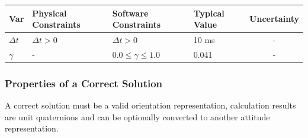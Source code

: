 \documentclass[12pt]{article}
\begin{document}

\begin{table}[!h]
  \caption{Input Variables} \label{TblInputVar}
  \renewcommand{\arraystretch}{1.2}
\noindent \begin{longtable*}{l l l l c}
\toprule
\textbf{Var} & \textbf{Physical Constraints} & \textbf{Software Constraints} & \textbf{Typical
Value} & \textbf{Uncertainty}\\
\midrule
    $\Delta t$ & $\Delta t > 0$ & $\Delta t > 0$ &
    10 \si[per-mode=symbol] {\milli\second} & - \\
    $\gamma$ & - & $0.0 \leq \gamma \leq 1.0$ & 0.041 & - \\
\bottomrule
\end{longtable*}
\end{table}



\subsubsection{Properties of a Correct Solution} \label{sec_CorrectSolution}

\noindent
A correct solution must be a valid orientation representation, calculation results are unit
quaternions and can be optionally converted to another attitude representation.
\end{document}
